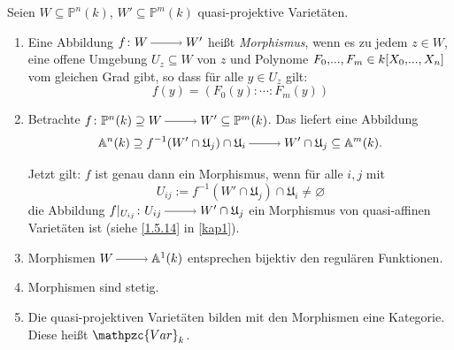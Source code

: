 \documentclass[a4paper,12pt,index=toc]{scrbook}
\theoremstyle{keinenummern} %
\def\A{\mathbb{A}}
\def\P{\mathbb{P}}
\newcommand{\Var}{\mathpzc{Var}}
\def\U{\mathfrak{U}}
\newcommand{\leer}{\ensuremath{\varnothing}}
\newcommand{\restrict}[1]{|_{#1}}
\renewcommand{\dotsc}{\ensuremath{\!...}}
\newcommand{\ppolyx}[1][n]{\ensuremath%
  [X_{0},\dotsc,X_{#1}]}
\begin{document}
\begin{db}\label{2.6.1}
Seien $W\subseteq \P^n(k)$, $W'\subseteq \P^m(k)$ quasi-projektive Varietäten.
  \begin{enumerate}
  \item{} Eine Abbildung $f\colon W\ra W'$ heißt \emph{Morphismus}, wenn es zu jedem $z \in W$, eine offene Umgebung $U_z \subseteq W$ von $z$ und Polynome $F_0,\dotsc,F_m \in k\ppolyx$ vom gleichen Grad gibt, so dass für alle $y \in U_z$ gilt:
\begin{equation*}f(y)=(F_0(y):\dotsm:F_m(y))\end{equation*}
  \item{} Betrachte $f \colon \P^n(k)\supseteq W \ra W' \subseteq \P^m(k)$. Das liefert eine Abbildung 
  \begin{equation*}\A^n(k)\supseteq f^{-1}(W'\cap \U_j) \cap \U_i \ra W' \cap \U_j\subseteq\A^{m}(k).\end{equation*} 

Jetzt gilt:
$f$ ist genau dann ein Morphismus, wenn für alle $i,j$ mit 
\begin{equation*}U_{ij}:=f^{-1}(W'\cap \U_j) \cap \U_i \neq \leer\end{equation*}
 die Abbildung $f\restrict{U_{ij}} \colon U_{ij} \ra W'\cap \U_j$ ein Morphismus von quasi-affinen Varietäten ist (siehe \cref{1.5.14} in \cref{kap1}).
  \item{} Morphismen $W\ra \A^1(k)$ entsprechen bijektiv den regulären Funktionen.
  \item{} Morphismen sind stetig.
  \item{} Die quasi-projektiven Varietäten bilden mit den Morphismen eine Kategorie. Diese heißt $\Var_k$.
  \end{enumerate}
\end{db}
\end{document}

